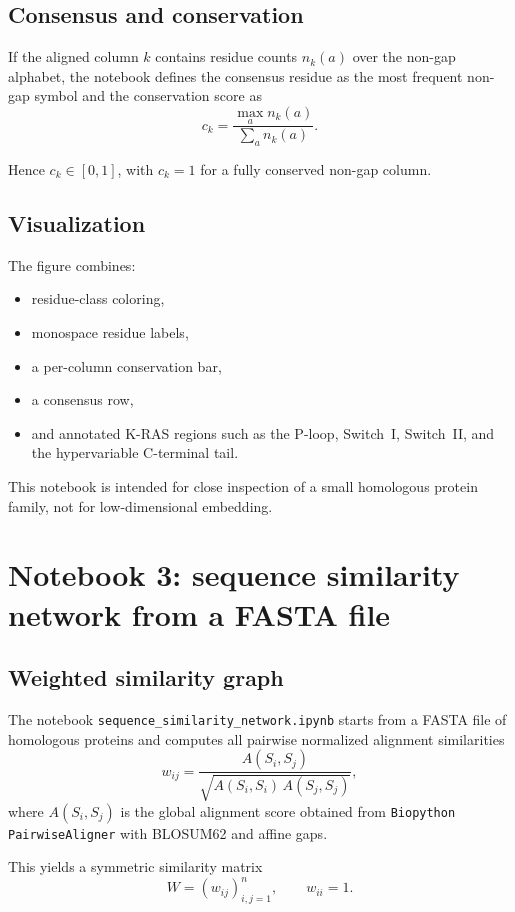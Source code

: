 \documentclass[11pt,a4paper]{article}
\begin{document}
\subsection{Consensus and conservation}

If the aligned column $k$ contains residue counts $n_k(a)$ over the non-gap alphabet, the notebook defines the consensus residue as the most frequent non-gap symbol and the conservation score as
\[
c_k=\frac{\max_a n_k(a)}{\sum_a n_k(a)}.
\]

Hence $c_k\in[0,1]$, with $c_k=1$ for a fully conserved non-gap column.

\subsection{Visualization}

The figure combines:

\begin{itemize}[leftmargin=*]
\item residue-class coloring,
\item monospace residue labels,
\item a per-column conservation bar,
\item a consensus row,
\item and annotated K-RAS regions such as the P-loop, Switch~I, Switch~II, and the hypervariable C-terminal tail.
\end{itemize}

This notebook is intended for close inspection of a small homologous protein family, not for low-dimensional embedding.

\section{Notebook 3: sequence similarity network from a FASTA file}

\subsection{Weighted similarity graph}

The notebook \texttt{sequence\_similarity\_network.ipynb} starts from a FASTA file of homologous proteins and computes all pairwise normalized alignment similarities
\[
w_{ij}=\frac{A(S_i,S_j)}{\sqrt{A(S_i,S_i)\,A(S_j,S_j)}},
\]
where $A(S_i,S_j)$ is the global alignment score obtained from \texttt{Biopython PairwiseAligner} with BLOSUM62 and affine gaps.

This yields a symmetric similarity matrix
\[
W=(w_{ij})_{i,j=1}^n,\qquad w_{ii}=1.
\]
\end{document}

